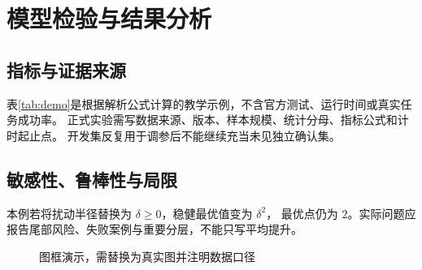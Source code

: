 \section{模型检验与结果分析}
\subsection{指标与证据来源}
表\ref{tab:demo}是根据解析公式计算的教学示例，不含官方测试、运行时间或真实任务成功率。
正式实验需写数据来源、版本、样本规模、统计分母、指标公式和计时起止点。
开发集反复用于调参后不能继续充当未见独立确认集。



\subsection{敏感性、鲁棒性与局限}
本例若将扰动半径替换为 $\delta\geq0$，稳健最优值变为 $\delta^2$，
最优点仍为 $2$。实际问题应报告尾部风险、失败案例与重要分层，不能只写平均提升。
\begin{figure}[htbp]
\centering\placeholderfigure
\caption{图框演示，需替换为真实图并注明数据口径}
\end{figure}
